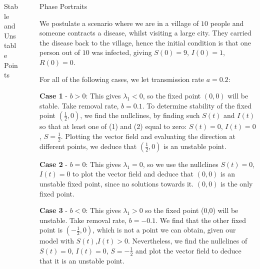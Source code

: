 \documentclass[final]{beamer}
\newlength{\sepwidth}
\newlength{\colwidth}
\newcommand{\separatorcolumn}{\begin{column}{\sepwidth}\end{column}}
\begin{document}
\begin{frame}[t]
\begin{columns}[t]
\begin{column}{\colwidth}
\begin{block}{Stable and Unstable Points}
  \end{block}



\end{column}

\separatorcolumn

\begin{column}{\colwidth}

  \begin{block}{Phase Portraits}

  We postulate a scenario where we are in a village of $10$ people and someone contracts a disease, whilst visiting a large city. They carried the disease back to the village, hence the initial condition is that one person out of $10$ was infected, giving $S(0) = 9$, $I(0) = 1$, $R(0) = 0$.
  
  For all of the following cases, we let transmission rate $a = 0.2$:

  
  \textbf{Case 1} - $b > 0$: This gives $\lambda_{1} < 0$, so the fixed point $(0,0)$ will be stable. Take removal rate, $b = 0.1$. To determine stability of the fixed point $(\frac{1}{2}, 0)$, we find the nullclines, by finding such $S(t)$ and $I(t)$ so that at least one of (1) and (2) equal to zero:  $S(t) = 0$, $I(t) = 0$, $S = \frac{1}{2}$. Plotting the vector field and evaluating the direction at different points, we deduce that $(\frac{1}{2},0)$ is an unstable point.
  
  \textbf{Case 2} - $b = 0$: This gives $\lambda_{1} = 0$, so we use the nullclines $S(t) = 0$, $I(t) = 0$ to plot the vector field and deduce that $(0,0)$ is an unstable fixed point, since no solutions towards it. $(0,0)$ is the only fixed point.

  \textbf{Case 3} - $b < 0$: This gives $\lambda_{1} > 0$ so the fixed point (0,0) will be unstable. Take removal rate, $b = - 0.1$. We find that the other fixed point is $(-\frac{1}{2},0)$, which is not a point we can obtain, given our model with $S(t)$,$I(t) > 0$. Nevertheless, we find the nullclines of $S(t) = 0$, $I(t) = 0$, $S = - \frac{1}{2}$ and plot the vector field to deduce that it is an unstable point.


\end{block}
\end{column}
\end{columns}
\end{frame}
\end{document}
